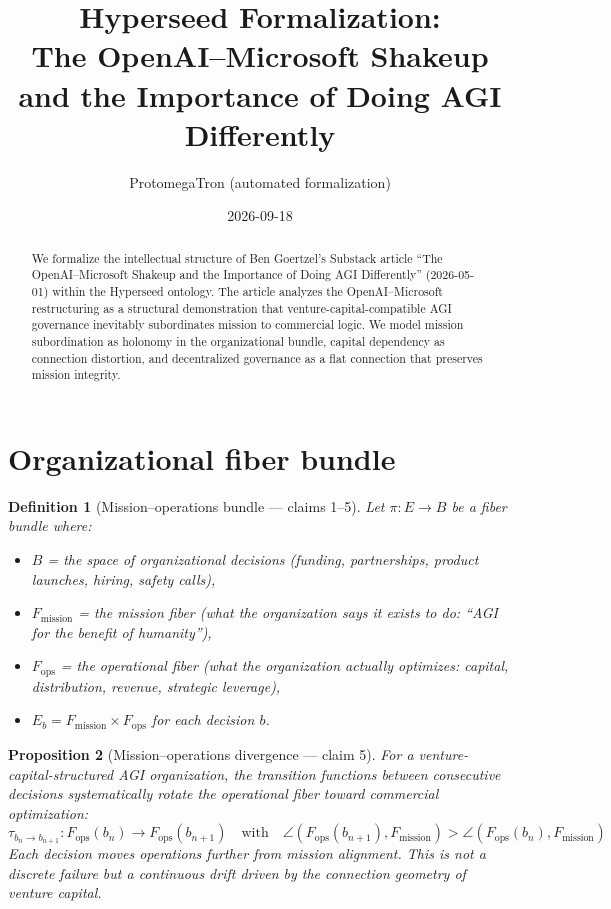 \documentclass[11pt,a4paper]{article}
\title{Hyperseed Formalization:\\
  The OpenAI--Microsoft Shakeup and the Importance of Doing AGI Differently}
\author{ProtomegaTron (automated formalization)}
\date{2026-09-18}
\newtheorem{definition}{Definition}[section]
\newtheorem{proposition}[definition]{Proposition}
\begin{document}
\maketitle

\begin{abstract}
We formalize the intellectual structure of Ben Goertzel's Substack article
``The OpenAI--Microsoft Shakeup and the Importance of Doing AGI Differently''
(2026-05-01) within the Hyperseed ontology. The article analyzes the
OpenAI--Microsoft restructuring as a structural demonstration that
venture-capital-compatible AGI governance inevitably subordinates mission
to commercial logic. We model mission subordination as holonomy in the
organizational bundle, capital dependency as connection distortion, and
decentralized governance as a flat connection that preserves mission
integrity.
\end{abstract}

\tableofcontents

\section{Organizational fiber bundle}
\label{sec:org-bundle}

\begin{definition}[Mission--operations bundle --- claims 1--5]
\label{def:mission-bundle}
Let $\pi : E \to B$ be a fiber bundle where:
\begin{itemize}
\item $B$ = the space of organizational decisions (funding, partnerships,
  product launches, hiring, safety calls),
\item $F_{\text{mission}}$ = the mission fiber (what the organization says
  it exists to do: ``AGI for the benefit of humanity''),
\item $F_{\text{ops}}$ = the operational fiber (what the organization
  actually optimizes: capital, distribution, revenue, strategic leverage),
\item $E_b = F_{\text{mission}} \times F_{\text{ops}}$ for each decision $b$.
\end{itemize}
\end{definition}

\begin{proposition}[Mission--operations divergence --- claim 5]
\label{prop:divergence}
For a venture-capital-structured AGI organization, the transition functions
between consecutive decisions systematically rotate the operational fiber
toward commercial optimization:
\[
  \tau_{b_n \to b_{n+1}} : F_{\text{ops}}(b_n) \to F_{\text{ops}}(b_{n+1})
  \quad \text{with} \quad
  \angle(F_{\text{ops}}(b_{n+1}), F_{\text{mission}}) >
  \angle(F_{\text{ops}}(b_n), F_{\text{mission}})
\]
Each decision moves operations further from mission alignment. This is
not a discrete failure but a continuous drift driven by the connection
geometry of venture capital.
\end{proposition}
\end{document}
